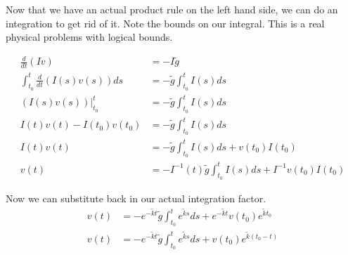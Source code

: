 Now that we have an actual product rule on the left hand side, we can do an integration to get rid of it. Note the bounds on our integral. This is a real physical problems with logical bounds.

\[
\begin{aligned}
\frac{d}{dt}(Iv) &= -I\tilde{g}\\
\int_{t_{0}}^{t}\frac{d}{dt}(I(s)v(s))ds &= -\tilde{g}\int_{t_{0}}^{t}I(s)ds\\
(I(s)v(s))|_{t_{0}}^{t} &= -\tilde{g}\int_{t_{0}}^{t}I(s)ds\\
I(t)v(t)-I(t_{0})v(t_{0}) &= -\tilde{g}\int_{t_{0}}^{t}I(s)ds\\
I(t)v(t) &= -\tilde{g}\int_{t_{0}}^{t}I(s)ds + v(t_{0})I(t_{0})\\
v(t) &= -I^{-1}(t)\tilde{g}\int_{t_{0}}^{t}I(s)ds + I^{-1}v(t_{0})I(t_{0})
\end{aligned}
\]

Now we can substitute back in our actual integration factor.
\[
\begin{aligned}
v(t) &= -e^{-\tilde{k}t}\tilde{g}\int_{t_{0}}^{t}e^{\tilde{k}s}ds + e^{-\tilde{k}t}v(t_{0})e^{\tilde{k}t_{0}}\\
v(t) &= -e^{-\tilde{k}t}\tilde{g}\int_{t_{0}}^{t}e^{\tilde{k}s}ds + v(t_{0})e^{\tilde{k}(t_{0}-t)}
\end{aligned}
\]

%